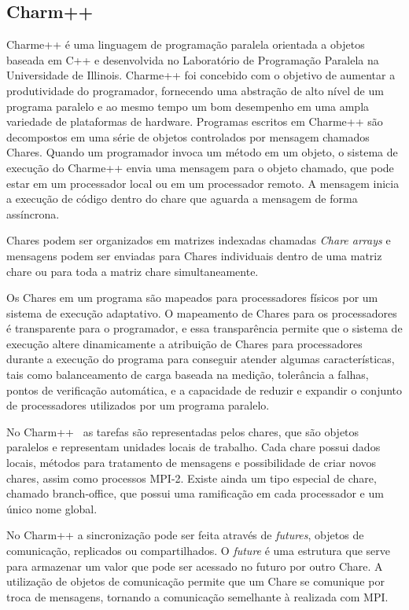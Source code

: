\subsection{Charm++}

Charme++ é uma linguagem de programação paralela orientada a objetos baseada em C++ e desenvolvida no Laboratório de Programação Paralela na Universidade de Illinois. Charme++ foi concebido com o objetivo de aumentar a produtividade do programador, fornecendo uma abstração de alto nível de um programa paralelo e ao mesmo tempo um bom desempenho em uma ampla variedade de plataformas de hardware. Programas escritos em Charme++ são decompostos em uma série de objetos controlados por mensagem chamados Chares. Quando um programador invoca um método em um objeto, o sistema de execução do Charme++ envia uma mensagem para o objeto chamado, que pode estar em um processador local ou em um processador remoto. A mensagem inicia a execução de código dentro do chare que aguarda a  mensagem de forma assíncrona. 

Chares podem ser organizados em matrizes indexadas chamadas \emph{Chare arrays} e mensagens podem ser enviadas para Chares individuais dentro de uma matriz chare ou para toda a matriz chare simultaneamente. 

Os Chares em um programa são mapeados para processadores físicos por um sistema de execução adaptativo. O mapeamento de Chares para os processadores é transparente para o programador, e essa transparência permite que o sistema de execução altere dinamicamente a atribuição de Chares para processadores durante a execução do programa para conseguir atender algumas características, tais como balanceamento de carga baseada na medição, tolerância a falhas, pontos de verificação automática, e a capacidade de reduzir e expandir o conjunto de processadores utilizados por um programa paralelo.

No Charm++~\citep{kunzman2006charm++} as tarefas são representadas pelos chares, que são objetos paralelos e representam unidades locais de trabalho. Cada chare possui dados locais, métodos para tratamento de mensagens e possibilidade de criar novos chares, assim como processos MPI-2. Existe ainda um tipo especial de chare, chamado branch-office, que possui uma ramificação em cada processador e um único nome global. 

No Charm++ a sincronização pode ser feita através de \emph{futures}, objetos de comunicação, replicados ou compartilhados. O \emph{future}  é uma estrutura que serve para armazenar um valor que pode ser acessado no futuro por outro Chare. A utilização de objetos de comunicação permite que um Chare se comunique por troca de mensagens, tornando a comunicação semelhante à realizada com MPI.

